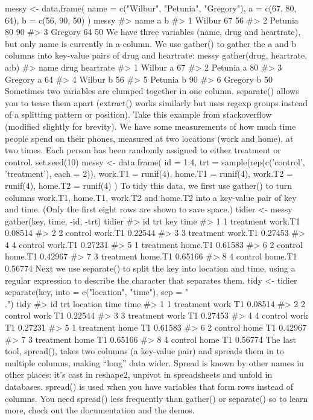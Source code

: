 messy <- data.frame(
  name = c("Wilbur", "Petunia", "Gregory"),
  a = c(67, 80, 64),
  b = c(56, 90, 50)
)
messy
#>      name  a  b
#> 1  Wilbur 67 56
#> 2 Petunia 80 90
#> 3 Gregory 64 50 
We have three variables (name, drug and heartrate), but only name is currently in a column. We use gather() to gather the a and b columns into key-value pairs of drug and heartrate:
 messy %
  gather(drug, heartrate, a:b)
#>      name drug heartrate
#> 1  Wilbur    a        67
#> 2 Petunia    a        80
#> 3 Gregory    a        64
#> 4  Wilbur    b        56
#> 5 Petunia    b        90
#> 6 Gregory    b        50 
Sometimes two variables are clumped together in one column. separate() allows you to tease them apart (extract() works similarly but uses regexp groups instead of a splitting pattern or position). Take this example from stackoverflow (modified slightly for brevity). We have some measurements of how much time people spend on their phones, measured at two locations (work and home), at two times. Each person has been randomly assigned to either treatment or control.
 set.seed(10)
messy <- data.frame(
  id = 1:4,
  trt = sample(rep(c('control', 'treatment'), each = 2)),
  work.T1 = runif(4),
  home.T1 = runif(4),
  work.T2 = runif(4),
  home.T2 = runif(4)
) 
To tidy this data, we first use gather() to turn columns work.T1, home.T1, work.T2 and home.T2 into a key-value pair of key and time. (Only the first eight rows are shown to save space.)
 tidier <- messy %
  gather(key, time, -id, -trt)
tidier %
#>   id       trt     key    time
#> 1  1 treatment work.T1 0.08514
#> 2  2   control work.T1 0.22544
#> 3  3 treatment work.T1 0.27453
#> 4  4   control work.T1 0.27231
#> 5  1 treatment home.T1 0.61583
#> 6  2   control home.T1 0.42967
#> 7  3 treatment home.T1 0.65166
#> 8  4   control home.T1 0.56774 
Next we use separate() to split the key into location and time, using a regular expression to describe the character that separates them.
 tidy <- tidier %
  separate(key, into = c("location", "time"), sep = "\\.") 
tidy %
#>   id       trt location time    time
#> 1  1 treatment     work   T1 0.08514
#> 2  2   control     work   T1 0.22544
#> 3  3 treatment     work   T1 0.27453
#> 4  4   control     work   T1 0.27231
#> 5  1 treatment     home   T1 0.61583
#> 6  2   control     home   T1 0.42967
#> 7  3 treatment     home   T1 0.65166
#> 8  4   control     home   T1 0.56774 
The last tool, spread(), takes two columns (a key-value pair) and spreads them in to multiple columns, making “long” data wider. Spread is known by other names in other places: it’s cast in reshape2, unpivot in spreadsheets and unfold in databases. spread() is used when you have variables that form rows instead of columns. You need spread() less frequently than gather() or separate() so to learn more, check out the documentation and the demos.
 

